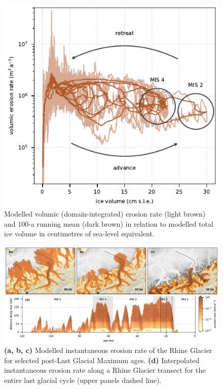\documentclass[utf8]{article}
\begin{document}
    \begin{figure}
      \centerline{\includegraphics{alpero_evolution}}
      \caption{%
        Modelled volumic (domain-integrated) erosion rate (light brown) and 100-a
        running mean (dark brown) in relation to modelled total ice volume in
        centimetres of sea-level equivalent.}
      \label{fig:evolution}
    \end{figure}

    \begin{figure}
      \centerline{\includegraphics{alpero_transects}}
      \caption{%
        \textbf{(a, b, c)} Modelled instantaneous erosion rate of the Rhine
          Glacier for selected post-Last Glacial Maximum ages.
        \textbf{(d)} Interpolated instantaneous erosion rate along a Rhine
          Glacier transect for the entire last glacial cycle (upper panels
          dashed line).}
      \label{fig:transects}
    \end{figure}
\end{document}
